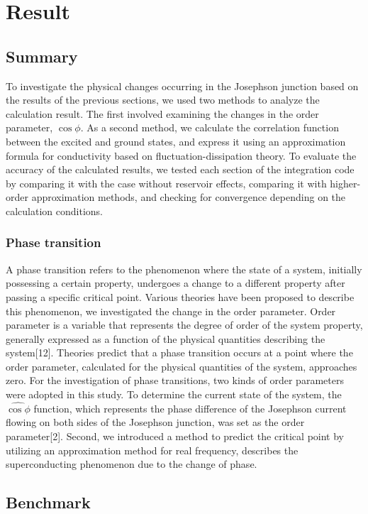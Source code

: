\documentclass{article}[12pt]
\begin{document}
\section{Result}
\begin{spacing}{1.5}
\subsection{Summary}
  To investigate the physical changes occurring in the Josephson junction based on the results of the previous sections,  
  we used two methods to analyze the calculation result. The first involved examining the changes in the order parameter, $\cos{\phi}$. 
  As a second method, we calculate the correlation function between the excited and ground states, and express it using an approximation formula for conductivity based on fluctuation-dissipation theory. 
  To evaluate the accuracy of the calculated results, 
  we tested each section of the integration code by comparing it with the case without reservoir effects, 
  comparing it with higher-order approximation methods, and checking for convergence depending on the calculation conditions.

  \subsubsection*{Phase transition}
A phase transition refers to the phenomenon where the state of a system, initially possessing a certain property, 
undergoes a change to a different property after passing a specific critical point. Various theories have been 
proposed to describe this phenomenon, we investigated the change in the order parameter. 
Order parameter is a variable that represents the degree of order of the system property, 
generally expressed as a function of the physical quantities describing the system[12]. 
Theories predict that a phase transition occurs at a point where the order parameter, 
calculated for the physical quantities of the system, approaches zero.
For the investigation of phase transitions, two kinds of order parameters were adopted in this study. 
To determine the current state of the system, the $\hat{\cos\phi}$ function, 
which represents the phase difference of the Josephson current flowing on both sides of the Josephson junction, 
was set as the order parameter[2]. Second, we introduced a method to predict 
the critical point by utilizing an approximation method for real frequency, 
describes the superconducting phenomenon due to the change of phase.
\pagebreak
\subsection{Benchmark}

\end{spacing}
\end{document}
